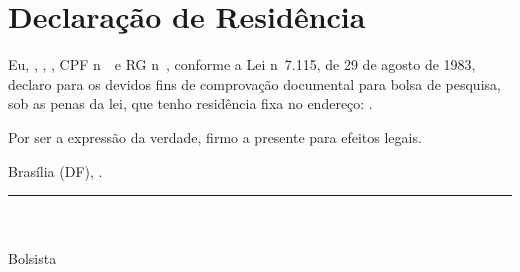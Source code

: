 
\cleardoublepage

   {\centering \section*{Declaração de Residência \label{sec:dec_residencia}}}
   \vspace{1cm}
   Eu, \textbf{\pesquisador}, \pesqnacionalidade, \pesqestadocivil, CPF n\ele\ \pesqcpf\ e RG n\ele\ \pesqrg, conforme a Lei n\ele\ 7.115, de 29 de agosto de 1983, declaro para os devidos fins de comprovação documental para bolsa de pesquisa, sob as penas da lei, que tenho residência fixa no endereço: \pesqend.
   
   Por ser a expressão da verdade, firmo a presente para efeitos legais.
   
   \vspace{.5cm}
   \begin{center}
       Brasília (DF), \hoje.
   \end{center}
   
   \begin{center}
      \vspace{2cm} \rule{8cm}{.01cm} \\
      \pesquisador \\
      \scriptsize Bolsista \\
   \end{center}

